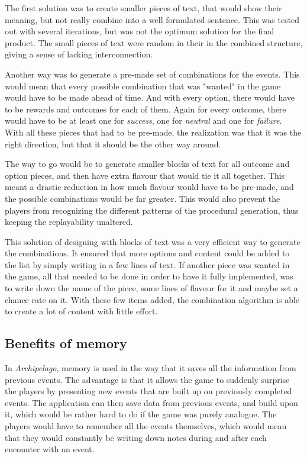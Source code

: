 The first solution was to create smaller pieces of text, that would show their meaning, but not really combine into a well formulated sentence. This was tested out with several iterations, but was not the optimum solution for the final product. The small pieces of text were random in their in the combined structure, giving a sense of lacking interconnection.

Another way was to generate a pre-made set of combinations for the events. This would mean that every possible combination that was "wanted" in the game would have to be made ahead of time. And with every option, there would have to be rewards and outcomes for each of them. Again for every outcome, there would have to be at least one for \textit{success}, one for \textit{neutral} and one for \textit{failure}. 
With all these pieces that had to be pre-made, the realization was that it was the right direction, but that it should be the other way around. 

The way to go would be to generate smaller blocks of text for all outcome and option pieces, and then have extra flavour that would tie it all together. This meant a drastic reduction in how much flavour would have to be pre-made, and the possible combinations would be far greater. This would also prevent the players from recognizing the different patterns of the procedural generation, thus keeping the replayability unaltered.

This solution of designing with blocks of text was a very efficient way to generate the combinations. It ensured that more options and content could be added to the list by simply writing in a few lines of text. If another piece was wanted in the game, all that needed to be done in order to have it fully implemented, was to write down the name of the piece, some lines of flavour for it and maybe set a chance rate on it. With these few items added, the combination algorithm is able to create a lot of content with little effort.

\subsection{Benefits of memory}
In \textit{Archipelago}, memory is used in the way that it saves all the information from previous events.
The advantage is that it allows the game to suddenly surprise the players by presenting new events that are built up on previously completed events. The application can then save data from previous events, and build upon it, which would be rather hard to do if the game was purely analogue. The players would have to remember all the events themselves, which would mean that they would constantly be writing down notes during and after each encounter with an event. 

